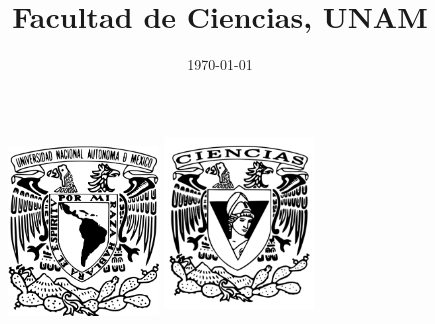\documentclass{article}
\title{Facultad de Ciencias, UNAM}
\date{\today}
\begin{document}
\thispagestyle{empty}

	\begin{figure}[ht]
			\includegraphics[width=4cm]{Logo_UNAM.png}
			\label{EscudoUNAM}
	   \endminipage
			\includegraphics[height = 4.9cm ,width=4cm]{Logo_FC.png}
			\label{EscudoFC}
		\endminipage
	\end{figure}
\end{document}
